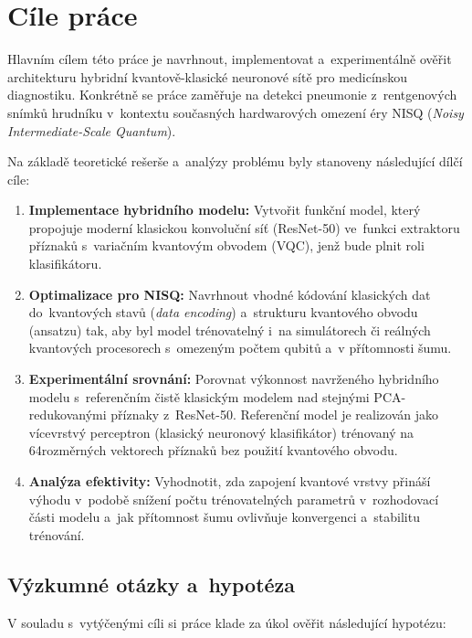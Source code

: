 \documentclass[12pt, a4paper]{report}
\begin{document}
\chapter{Cíle práce}

Hlavním cílem této práce je navrhnout, implementovat a~experimentálně ověřit
architekturu hybridní kvantově-klasické neuronové sítě pro medicínskou
diagnostiku. Konkrétně se práce zaměřuje na detekci pneumonie z~rentgenových
snímků hrudníku v~kontextu současných hardwarových omezení éry NISQ
(\emph{Noisy Intermediate-Scale Quantum}).

Na základě teoretické rešerše a~analýzy problému byly stanoveny následující
dílčí cíle:

\begin{enumerate}
  \item \textbf{Implementace hybridního modelu:}
  Vytvořit funkční model, který propojuje moderní klasickou konvoluční síť
  (ResNet-50) ve~funkci extraktoru příznaků s~variačním kvantovým obvodem (VQC),
  jenž bude plnit roli klasifikátoru.

  \item \textbf{Optimalizace pro NISQ:}
  Navrhnout vhodné kódování klasických dat do~kvantových stavů
  (\emph{data encoding}) a~strukturu kvantového obvodu (ansatzu) tak, aby byl
  model trénovatelný i~na simulátorech či reálných kvantových procesorech
  s~omezeným počtem qubitů a~v přítomnosti šumu.

  \item \textbf{Experimentální srovnání:}
  Porovnat výkonnost navrženého hybridního modelu s~referenčním čistě
  klasickým modelem nad stejnými PCA-redukovanými příznaky z~ResNet-50.
  Referenční model je realizován jako vícevrstvý perceptron (klasický
  neuronový klasifikátor) trénovaný na 64rozměrných vektorech příznaků
  bez použití kvantového obvodu.

  \item \textbf{Analýza efektivity:}
  Vyhodnotit, zda zapojení kvantové vrstvy přináší výhodu v~podobě snížení
  počtu trénovatelných parametrů v~rozhodovací části modelu a~jak přítomnost
  šumu ovlivňuje konvergenci a~stabilitu trénování.
\end{enumerate}

\section*{Výzkumné otázky a~hypotéza}

V souladu s~vytýčenými cíli si práce klade za úkol ověřit následující
hypotézu:
\end{document}
